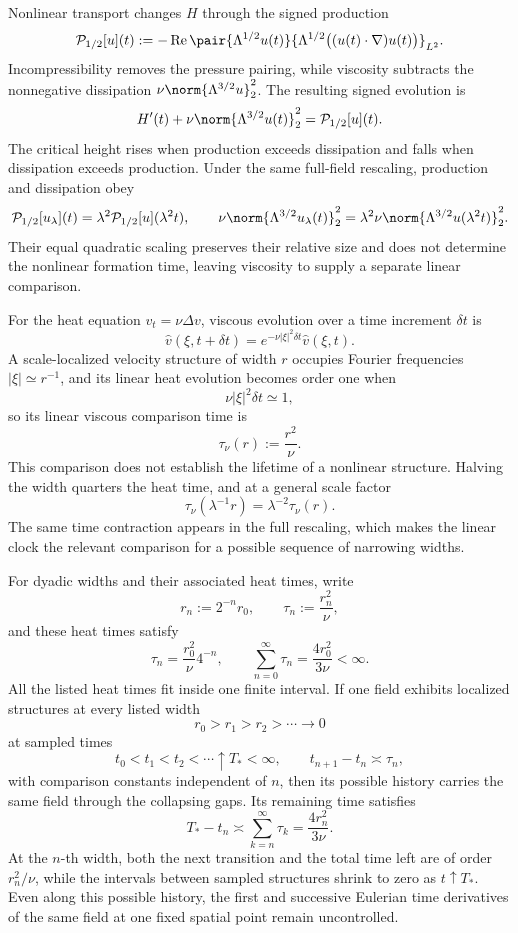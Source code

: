 
Nonlinear transport changes \(H\) through the signed production
\[
  \mathcal P_{1/2}[u](t)
  :=
  -\operatorname{Re}
  \pair
    {\Lambda^{1/2}u(t)}
    {\Lambda^{1/2}\bigl((u(t)\cdot\nabla)u(t)\bigr)}_{L^2}.
\]
Incompressibility removes the pressure pairing, while viscosity subtracts the nonnegative dissipation \(\nu\norm{\Lambda^{3/2}u}_2^2\). The resulting signed evolution is
\[
  H'(t)
  +
  \nu\norm{\Lambda^{3/2}u(t)}_2^2
  =
  \mathcal P_{1/2}[u](t).
\]
The critical height rises when production exceeds dissipation and falls when dissipation exceeds production. Under the same full-field rescaling, production and dissipation obey
\[
  \mathcal P_{1/2}[u_\lambda](t)
  =
  \lambda^2\mathcal P_{1/2}[u](\lambda^2t),
  \qquad
  \nu\norm{\Lambda^{3/2}u_\lambda(t)}_2^2
  =
  \lambda^2\nu\norm{\Lambda^{3/2}u(\lambda^2t)}_2^2.
\]
Their equal quadratic scaling preserves their relative size and does not determine the nonlinear formation time, leaving viscosity to supply a separate linear comparison.


For the heat equation \(v_t=\nu\Delta v\), viscous evolution over a time increment \(\delta t\) is
\[
  \widehat v(\xi,t+\delta t)
  =
  e^{-\nu|\xi|^2\delta t}\widehat v(\xi,t).
\]
A scale-localized velocity structure of width \(r\) occupies Fourier frequencies \(|\xi|\simeq r^{-1}\), and its linear heat evolution becomes order one when
\[
  \nu|\xi|^2\delta t\simeq1,
\]
so its linear viscous comparison time is
\[
  \tau_\nu(r)
  :=
  \frac{r^2}{\nu}.
\]
This comparison does not establish the lifetime of a nonlinear structure. Halving the width quarters the heat time, and at a general scale factor
\[
  \tau_\nu(\lambda^{-1}r)
  =
  \lambda^{-2}\tau_\nu(r).
\]
The same time contraction appears in the full \NavierStokes{} rescaling, which makes the linear clock the relevant comparison for a possible sequence of narrowing widths.


For dyadic widths and their associated heat times, write
\[
  r_n:=2^{-n}r_0,
  \qquad
  \tau_n:=\frac{r_n^2}{\nu},
\]
and these heat times satisfy
\[
  \tau_n
  =
  \frac{r_0^2}{\nu}4^{-n},
  \qquad
  \sum_{n=0}^{\infty}\tau_n
  =
  \frac{4r_0^2}{3\nu}
  <
  \infty.
\]
All the listed heat times fit inside one finite interval. If one \NavierStokes{} field exhibits localized structures at every listed width
\[
  r_0>r_1>r_2>\cdots\longrightarrow0
\]
at sampled times
\[
  t_0<t_1<t_2<\cdots\uparrow T_*<\infty,
  \qquad
  t_{n+1}-t_n\asymp\tau_n,
\]
with comparison constants independent of \(n\), then its possible history carries the same field through the collapsing gaps. Its remaining time satisfies
\[
  T_*-t_n
  \asymp
  \sum_{k=n}^{\infty}\tau_k
  =
  \frac{4r_n^2}{3\nu}.
\]
At the \(n\)-th width, both the next transition and the total time left are of order \(r_n^2/\nu\), while the intervals between sampled structures shrink to zero as \(t\uparrow T_*\). Even along this possible history, the first and successive Eulerian time derivatives of the same field at one fixed spatial point remain uncontrolled.